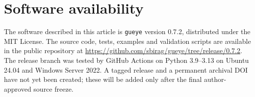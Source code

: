 \documentclass[preprint,12pt,a4paper]{elsarticle}
\begin{document}
\section*{Software availability}
The software described in this article is \texttt{gueye} version 0.7.2, distributed under the MIT License. The source code, tests, examples and validation scripts are available in the public repository at \url{https://github.com/sbirag/gueye/tree/release/0.7.2}. The release branch was tested by GitHub Actions on Python 3.9--3.13 on Ubuntu 24.04 and Windows Server 2022. A tagged release and a permanent archival DOI have not yet been created; these will be added only after the final author-approved source freeze.
\end{document}
